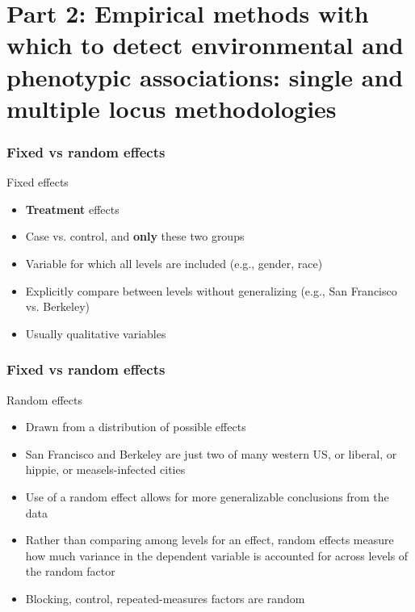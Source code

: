 
\section[Part 2]{Part 2: Empirical methods with which to detect
environmental and phenotypic associations: single and multiple locus
methodologies}

\begin{frame}
\frametitle{Fixed vs random effects}
\begin{block}{Fixed effects}
\begin{itemize}
\item{\textbf{Treatment} effects}
\item{Case vs. control, and \textbf{only} these two groups}
\item{Variable for which all levels are included (e.g., gender, race)}
\item{Explicitly compare between levels without generalizing (e.g., San
Francisco vs. Berkeley)}
\item{Usually qualitative variables}
\end{itemize}
\end{block}
\tiny
\citet{StroupFreund200203}
\end{frame}


\begin{frame}
\frametitle{Fixed vs random effects}
\begin{block}{Random effects}
\begin{itemize}
\item{Drawn from a distribution of possible effects}
\item{San Francisco and Berkeley are just two of many western US, 
or liberal, or hippie, or measels-infected cities}
\item{Use of a random effect allows for more generalizable conclusions 
from the data}
\item{Rather than comparing among levels for an effect, random 
effects measure how much variance in the dependent variable is 
accounted for across levels of the random factor}
\item{Blocking, control, repeated-measures factors are random}
\end{itemize}
\end{block}
\tiny
\citet{StroupFreund200203}
\end{frame}

